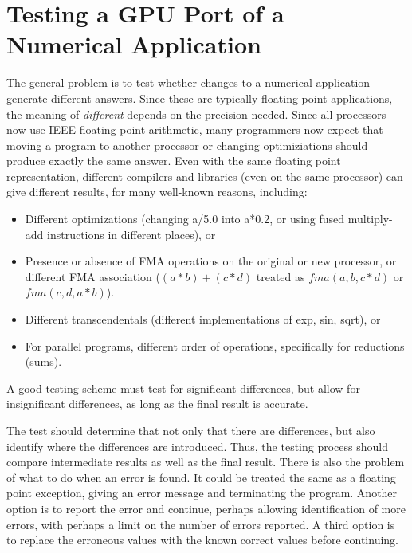 \section{Testing a GPU Port of a Numerical Application}

The general problem is to test whether changes to a numerical application generate different answers.
Since these are typically floating point applications, the meaning of \emph{different} depends on the precision needed.
Since all processors now use IEEE floating point arithmetic\cite{goldberg.cs.91}, many programmers now expect that moving a program to another processor or changing optimiziations should produce exactly the same answer.
Even with the same floating point representation, different compilers and libraries (even on the same processor) can give different results, for many well-known reasons, including:
\begin{itemize}
\item Different optimizations (changing a/5.0 into a*0.2, or using fused multiply-add instructions in different places), or
\item Presence or absence of FMA operations on the original or new processor, or different FMA association ($(a*b)+(c*d)$ treated as $\textit{fma}(a,b,c*d)$ or $\textit{fma}(c,d,a*b)$).
\item Different transcendentals (different implementations of exp, sin, sqrt), or
\item For parallel programs, different order of operations, specifically for reductions (sums).
\end{itemize}
A good testing scheme must test for significant differences, but allow for insignificant differences, as long as the final result is accurate.

The test should determine that not only that there are differences, but also identify where the differences are introduced.
Thus, the testing process should compare intermediate results as well as the final result.
There is also the problem of what to do when an error is found.
It could be treated the same as a floating point exception, giving an error message and terminating the program.
Another option is to report the error and continue, perhaps allowing identification of more errors, with perhaps a limit on the number of errors reported.
A third option is to replace the erroneous values with the known correct values before continuing.


